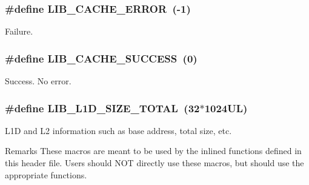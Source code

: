 \subsubsection[{L\+I\+B\+\_\+\+C\+A\+C\+H\+E\+\_\+\+E\+R\+R\+O\+R}]{\setlength{\rightskip}{0pt plus 5cm}\#define L\+I\+B\+\_\+\+C\+A\+C\+H\+E\+\_\+\+E\+R\+R\+O\+R~(-\/1)}\label{group__libarch__cachecfg_gab447a2c2ef93390a4ae137b80fc575a9}
Failure. \hypertarget{group__libarch__cachecfg_ga2e6fd05c3ca05c5fda056c53f1b0e583}{}
\subsubsection[{L\+I\+B\+\_\+\+C\+A\+C\+H\+E\+\_\+\+S\+U\+C\+C\+E\+S\+S}]{\setlength{\rightskip}{0pt plus 5cm}\#define L\+I\+B\+\_\+\+C\+A\+C\+H\+E\+\_\+\+S\+U\+C\+C\+E\+S\+S~(0)}\label{group__libarch__cachecfg_ga2e6fd05c3ca05c5fda056c53f1b0e583}
Success. No error. \hypertarget{group__libarch__cachecfg_gaa53b184a257b7a1265603b599f0b3ea2}{}
\subsubsection[{L\+I\+B\+\_\+\+L1\+D\+\_\+\+S\+I\+Z\+E\+\_\+\+T\+O\+T\+A\+L}]{\setlength{\rightskip}{0pt plus 5cm}\#define L\+I\+B\+\_\+\+L1\+D\+\_\+\+S\+I\+Z\+E\+\_\+\+T\+O\+T\+A\+L~(32$\ast$1024\+U\+L)}\label{group__libarch__cachecfg_gaa53b184a257b7a1265603b599f0b3ea2}


L1\+D and L2 information such as base address, total size, etc. 

\begin{DoxyRemark}{Remarks}
These macros are meant to be used by the inlined functions defined in this header file. Users should N\+O\+T directly use these macros, but should use the appropriate functions. 
\end{DoxyRemark}


